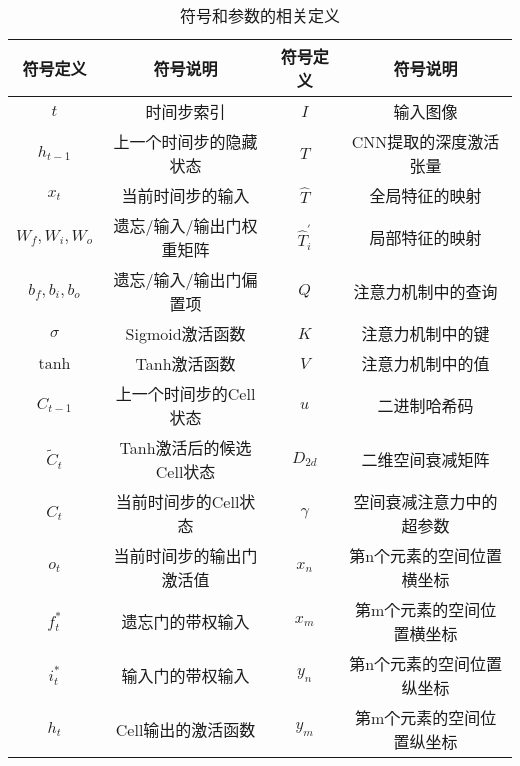 \begin{table}[h]
    \caption{符号和参数的相关定义}\label{tab:parameter_explain}
    \centering
    \resizebox{0.9\linewidth}{!}
    {\begin{tabular}{*4{c}}
    \toprule
    符号定义 & 符号说明 & 符号定义 & 符号说明 \\
    \midrule
        $t$       & 时间步索引                       & $I$           & 输入图像             \\
        $h_{t-1}$  & 上一个时间步的隐藏状态            & $T$           & CNN提取的深度激活张量     \\
        $x_t$     & 当前时间步的输入                  & $\widehat{T}$& 全局特征的映射          \\
        $W_f, W_i, W_o$ & 遗忘/输入/输出门权重矩阵     & $\widehat{T}_i^{\prime}$ & 局部特征的映射      \\
        $b_f, b_i, b_o$ & 遗忘/输入/输出门偏置项       & $Q$         & 注意力机制中的查询        \\
        $\sigma$  & Sigmoid激活函数                  & $K$         & 注意力机制中的键         \\
        $\tanh$   & Tanh激活函数                     & $V$         & 注意力机制中的值         \\
        $C_{t-1}$  & 上一个时间步的Cell状态            &   $u$       &        二进制哈希码         \\ 
        $\tilde{C}_t$ & Tanh激活后的候选Cell状态       & $D_{2d}$    & 二维空间衰减矩阵         \\
        $C_t$     & 当前时间步的Cell状态               & $\gamma$    & 空间衰减注意力中的超参数     \\
        $o_t$     & 当前时间步的输出门激活值             & $x_n$       & 第n个元素的空间位置横坐标    \\
        $f_t^*$   & 遗忘门的带权输入                   & $x_m$       & 第m个元素的空间位置横坐标    \\
        $i_t^*$   & 输入门的带权输入                   & $y_n$       & 第n个元素的空间位置纵坐标    \\
        $h_t$     & Cell输出的激活函数                 & $y_m$       & 第m个元素的空间位置纵坐标   \\
    \bottomrule
    \end{tabular}}    
    \vspace{-0.8em}
\end{table}

